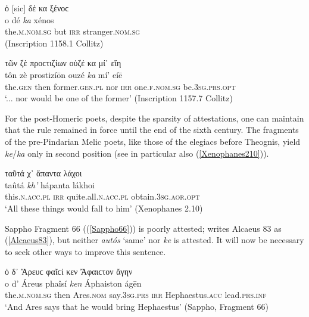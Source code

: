 \begin{exe}
\ex ὀ {[}sic{]} δέ κα ξένοϲ\\
\gll o dé \emph{ka} xénos\\
the.\textsc{m.nom.sg} but \textsc{irr} stranger.\textsc{nom.sg}\\
\trans (Inscription 1158.1 Collitz)
\label{Elian7}
\end{exe}

\begin{exe}
\ex τῶν ζὲ προϲτιζίων οὐζέ κα μί᾽ εἴη\\
\gll tôn zè prostizíōn ouzé \emph{ka} mí' eíē\\
the.\textsc{gen} then former.\textsc{gen.pl} nor \textsc{irr}
one.\textsc{f.nom.sg} be.\textsc{3sg.prs.opt}\\
\trans `... nor would be one of the former' (Inscription 1157.7 Collitz)
\label{Elian8}
\end{exe}

For the post-Homeric poets, despite the sparsity of attestations, one can maintain that the rule remained in force until the end of the sixth century. The fragments of the pre-Pindarian Melic poets, like those of the elegiacs before Theognis, yield \textit{ke}/\textit{ka} only in second position (see in particular also (\ref{Xenophanes210})). 

\begin{exe}
\ex ταῦτά χ᾽ ἅπαντα λάχοι\\
\gll taûtá \emph{kh'} hápanta lákhoi\\
this.\textsc{n.acc.pl} \textsc{irr} quite.all.\textsc{n.acc.pl} obtain.\textsc{3sg.aor.opt}\\
\trans `All these things would fall to him' (Xenophanes 2.10)
\label{Xenophanes210}
\end{exe}

Sappho Fragment 66 ((\ref{Sappho66})) is poorly attested; \citet[177]{Bergk1882} writes Alcaeus 83 as (\ref{Alcaeus83}), but neither \textit{autós} `same' nor \textit{ke} is attested. It will now be necessary to seek other ways to improve this sentence.

\begin{exe}
\ex ὀ δ᾽ Ἄρευϲ φαῖϲί κεν Ἄφαιϲτον ἄγην\\
\gll o d' Áreus phaîsí \emph{ken} Áphaiston ágēn\\
the.\textsc{m.nom.sg} then Ares.\textsc{nom} say.\textsc{3sg.prs} \textsc{irr} Hephaestus.\textsc{acc} lead.\textsc{prs.inf}\\
\trans `And Ares says that he would bring Hephaestus' (Sappho, Fragment 66)
\label{Sappho66}
\end{exe}

